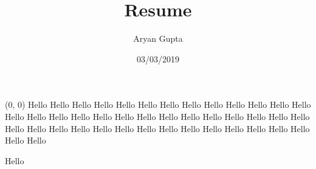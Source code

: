 \documentclass{article}
\title{Resume}
\date{03/03/2019}
\author{Aryan Gupta}
\begin{document}
	\begin{textblock}{6}(0, 0)
		Hello Hello Hello Hello Hello Hello Hello Hello Hello Hello Hello Hello Hello Hello Hello Hello Hello Hello Hello Hello Hello Hello Hello Hello Hello Hello Hello Hello Hello Hello Hello Hello Hello Hello Hello Hello Hello Hello Hello Hello Hello Hello Hello
	\end{textblock}
	Hello
\end{document}
